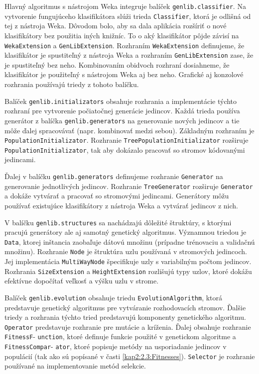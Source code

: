 Hlavný algoritmus s nástrojom Weka integruje balíček \verb|genlib.classifier|. Na vytvorenie fungujúceho klasifikátora slúži trieda \verb|Classifier|, ktorá je odlišná od tej z nástroja Weka. Dôvodom bolo, aby sa dala aplikácia rozšíriť o nové klasifikátory bez použitia iných knižníc. To o aký klasifikátor pôjde závisí na \verb|WekaExtension| a \verb|GenLibExtension|. Rozhraním \verb|WekaExtension| definujeme, že klasifikátor je spustiteľný z nástroja Weka a rozhraním \verb|GenLibExtension| zase, že je spustiteľný bez neho. Kombinovaním obidvoch rozhraní dosiahneme, že klasifikátor je použiteľný s nástrojom Weka aj bez neho. Grafické aj konzolové rozhrania používajú triedy z tohoto balíčku.

Balíček \verb|genlib.initializators| obsahuje rozhrania a implementácie týchto rozhraní pre vytvorenie počiatočnej generácie jedincov. Každá trieda používa generátor z balíčka \verb|genlib.generators| na generovanie nových jedincov a tie môže ďalej spracovávať (napr. kombinovať medzi sebou). Základným rozhraním je \verb|PopulationInitializator|. Rozhranie  \verb|TreePopulationInitializator| rozširuje \verb|PopulationInitializator|, tak aby dokázalo pracovať so stromov kódovanými jedincami.

Ďalej v balíčku \verb|genlib.generators| definujeme rozhranie  \verb|Generator| na generovanie jednotlivých jedincov. Rozhranie \verb|TreeGenerator| rozširuje \verb|Generator| a dokáže vytvárať a pracovať so stromovými jedincami. Generátory môžu používať existujúce klasifikátory z nástroja Weka a vytvárať jedincov z nich.

V balíčku \verb|genlib.structures| sa nachádzajú dôležité štruktúry, s ktorými pracujú generátory ale aj samotný genetický algoritmus. Významnou triedou je \verb|Data|, ktorej inštancia zaobaľuje dátovú množinu (prípadne trénovaciu a validačnú množinu). Rozhranie \verb|Node| je štruktúra uzlu používaná v stromových jedincoch. Jej implementácia \verb|MultiWayNode| špecifikuje uzly s variabilným počtom jedincov. Rozhrania \verb|SizeExtension| a \verb|HeightExtension| rozlišujú typy uzlov, ktoré dokážu efektívne dopočítať veľkosť a výšku uzlu v strome.

Balíček \verb|genlib.evolution| obsahuje triedu \verb|EvolutionAlgorithm|, ktorá predstavuje genetický algoritmus pre vytváranie rozhodovacích stromov. Ďalšie triedy a rozhrania týchto tried predstavujú komponenty genetického algoritmu. \verb|Operator| predstavuje rozhranie pre mutácie a kríženia. Ďalej obsahuje rozhranie \verb|FitnessF|- \verb|unction|, ktoré definuje funkcie použité v genetickom algoritme a \verb|FitnessCompar|- \verb|ator|, ktoré popisuje metódy na usporiadanie jedincov v populácií (tak ako sú popísané v časti \ref{kap2:2.3:Fitnesses}). \verb|Selector| je rozhranie používané na implementovanie metód selekcie.


